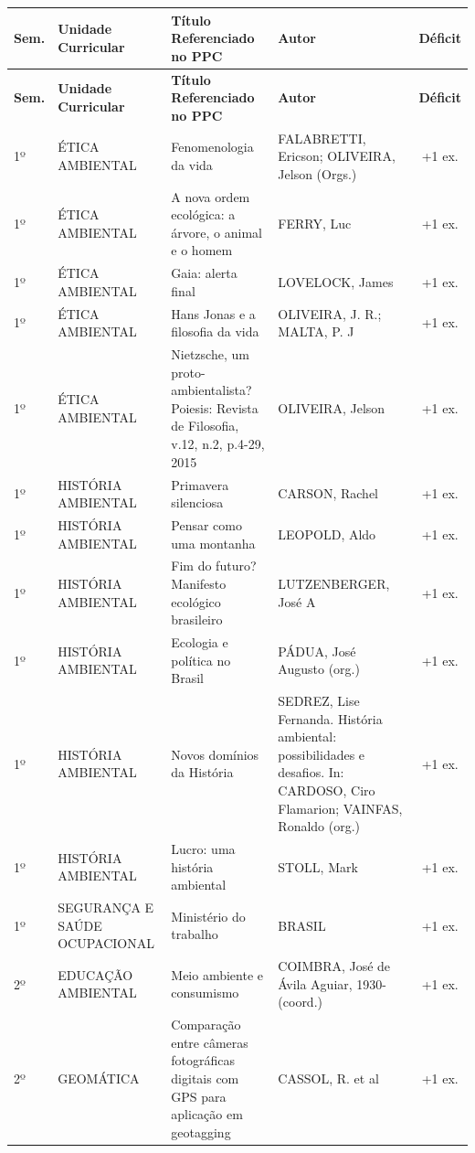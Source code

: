 \documentclass[11pt,a4paper]{article}
\begin{document}
\begin{longtable}{|p{1.2cm}|p{3.5cm}|p{6cm}|p{3.5cm}|c|}
\hline
\textbf{Sem.} & \textbf{Unidade Curricular} & \textbf{Título Referenciado no PPC} & \textbf{Autor} & \textbf{Déficit} \\ \hline
\endfirsthead
\hline
\textbf{Sem.} & \textbf{Unidade Curricular} & \textbf{Título Referenciado no PPC} & \textbf{Autor} & \textbf{Déficit} \\ \hline
\endhead
1º & ÉTICA AMBIENTAL & Fenomenologia da vida & FALABRETTI, Ericson; OLIVEIRA, Jelson (Orgs.) & +1 ex. \\ \hline
1º & ÉTICA AMBIENTAL & A nova ordem ecológica: a árvore, o animal e o homem & FERRY, Luc & +1 ex. \\ \hline
1º & ÉTICA AMBIENTAL & Gaia: alerta final & LOVELOCK, James & +1 ex. \\ \hline
1º & ÉTICA AMBIENTAL & Hans Jonas e a filosofia da vida & OLIVEIRA, J. R.; MALTA, P. J & +1 ex. \\ \hline
1º & ÉTICA AMBIENTAL & Nietzsche, um proto-ambientalista? Poiesis: Revista de Filosofia, v.12, n.2, p.4-29, 2015 & OLIVEIRA, Jelson & +1 ex. \\ \hline
1º & HISTÓRIA AMBIENTAL & Primavera silenciosa & CARSON, Rachel & +1 ex. \\ \hline
1º & HISTÓRIA AMBIENTAL & Pensar como uma montanha & LEOPOLD, Aldo & +1 ex. \\ \hline
1º & HISTÓRIA AMBIENTAL & Fim do futuro? Manifesto ecológico brasileiro & LUTZENBERGER, José A & +1 ex. \\ \hline
1º & HISTÓRIA AMBIENTAL & Ecologia e política no Brasil & PÁDUA, José Augusto (org.) & +1 ex. \\ \hline
1º & HISTÓRIA AMBIENTAL & Novos domínios da História & SEDREZ, Lise Fernanda. História ambiental: possibilidades e desafios. In: CARDOSO, Ciro Flamarion; VAINFAS, Ronaldo (org.) & +1 ex. \\ \hline
1º & HISTÓRIA AMBIENTAL & Lucro: uma história ambiental & STOLL, Mark & +1 ex. \\ \hline
1º & SEGURANÇA E SAÚDE OCUPACIONAL & Ministério do trabalho & BRASIL & +1 ex. \\ \hline
2º & EDUCAÇÃO AMBIENTAL & Meio ambiente e consumismo & COIMBRA, José de Ávila Aguiar, 1930- (coord.) & +1 ex. \\ \hline
2º & GEOMÁTICA & Comparação entre câmeras fotográficas digitais com GPS para aplicação em geotagging & CASSOL, R. et al & +1 ex. \\ \hline

\end{longtable}
\end{document}
